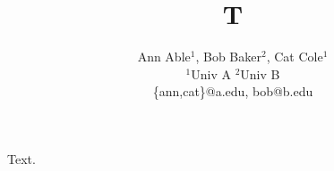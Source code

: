 \documentclass{article}
\title{T}
\author{\begin{minipage}{0.9\textwidth}
\centering
Ann Able$^{1}$, Bob Baker$^{2}$, Cat Cole$^{1}$\\
\small $^{1}$Univ A \quad $^{2}$Univ B\\
{\scriptsize\ttfamily \{ann,cat\}@a.edu, bob@b.edu}
\end{minipage}}
\begin{document}
\maketitle
Text.
\end{document}
